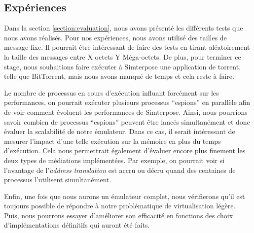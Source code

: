 \subsection{Expériences}
Dans la section \ref{section:evaluation}, nous avons présenté les différents tests que nous avons réalisés. Pour nos expériences, nous avons utilisé des tailles de message fixe. Il pourrait être intéressant de faire des tests en tirant aléatoirement la taille des messages entre X octets Y Méga-octets. De plus, pour terminer ce stage, nous souhaitions faire exécuter à Simterpose une application de torrent, telle que BitTorrent, mais nous avons manqué de temps et cela reste à faire.

Le nombre de processus en cours d'exécution influant forcément sur les performances, on pourrait exécuter plusieurs processus ``espions'' en parallèle afin de voir comment évoluent les performances de Simterpose. Ainsi, nous pourrions savoir  combien de processus ``espions'' peuvent être lancés simultanément et donc évaluer la scalabilité de notre émulateur. Dans ce cas, il serait intéressant de mesurer l'impact d'une telle exécution sur la mémoire en plus du temps d'exécution. Cela nous permettrait également d'évaluer encore plus finement les deux types de médiations implémentées. Par exemple, on pourrait voir si l'avantage de l'\textit{address translation} est accru ou décru quand des centaines de processus l'utilisent simultanément.

Enfin, une fois que nous aurons un émulateur complet, nous vérifierons qu'il est toujours possible de répondre à notre problématique de virtualisation légère. Puis, nous pourrons essayer d'améliorer son efficacité en fonctions des choix d'implémentations définitifs qui auront été faits.


